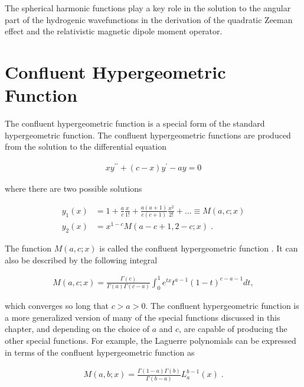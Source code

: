         \noindent The spherical harmonic functions play a key role in the solution to the angular part of the hydrogenic wavefunctions in the derivation of the quadratic Zeeman effect and the relativistic magnetic dipole moment operator.

        \section{Confluent Hypergeometric Function} \label{sec:Confluent_Hypergeometric_Function}
        The confluent hypergeometric function is a special form of the standard hypergeometric function. The confluent hypergeometric functions are produced from the solution to the differential equation 

        \begin{align}
            xy^{\prime \prime} + (c - x)y^\prime - ay = 0
        \end{align}

        \noindent where there are two possible solutions 

        \begin{align}
            y_1(x) &= 1 + \frac{a}{c} \frac{x}{1!} + \frac{a(a+1)}{c(c+1)}\frac{x^2}{2!} + \dots \equiv M(a, c ;x)\\
            y_2(x) &= x^{1-c}M(a-c + 1, 2 - c; x)\;.
        \end{align}

        \noindent The function $M(a, c;x)$ is called the confluent hypergeometric function \cite{Riley_Hobson_Bence_2006}. It can also be described by the following integral 

        \begin{align}
            M(a, c; x) = \frac{\Gamma(c)}{\Gamma(a)\Gamma(c - a)} \int_0^1 e^{tx} t^{a-1} (1 - t)^{c - a - 1} dt,
        \end{align}

        \noindent which converges so long that $c > a > 0$. The confluent hypergeometric function is a more generalized version of many of the special functions discussed in this chapter, and depending on the choice of $a$ and $c$, are capable of producing the other special functions. For example, the Laguerre polynomials can be expressed in terms of the confluent hypergeometric function as 

        \begin{align}
            M(a, b; x) = \frac{\Gamma(1 - a) \Gamma(b)}{\Gamma(b - a)} L_a^{b-1}(x)\;. \label{eq:confluent-hypergeometric}
        \end{align}

